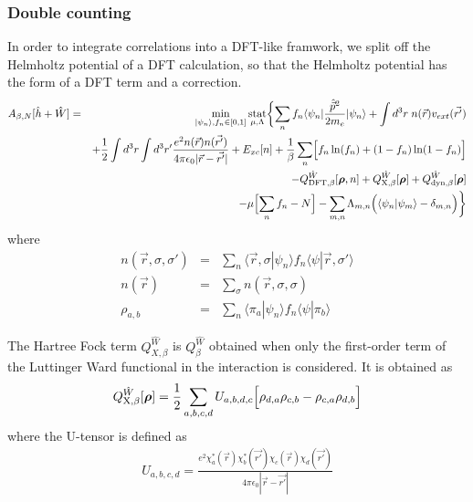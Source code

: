 \documentclass[11pt,a4paper]{report}
\newcommand{\mat}[1]{\bm{#1}}  %
\DeclareMathOperator*{\stat}{stat}
\begin{document}
\subsubsection{Double counting}
In order to integrate correlations into a DFT-like framwork, we split
off the Helmholtz potential of a DFT calculation, so that the
Helmholtz potential has the form of a DFT term and a correction.
\begin{eqnarray}
A_{\beta,N}[\hat{h}+\hat{W}]
&=&\min_{|\psi_n\rangle,f_n\in[0,1]}\stat_{\mu,\Lambda}
\biggl\lbrace
\sum_n f_n\langle\psi_n|\frac{\hat{\vec{p}}^2}{2m_e}|\psi_n\rangle
+\int d^3r\;n(\vec{r})v_{ext}(\vec{r'})
\nonumber\\
&&+\frac{1}{2}\int d^3r\int d^3r'
\frac{e^2n(\vec{r})n(\vec{r'})}{4\pi\epsilon_0|\vec{r}-\vec{r'}|}
+E_{xc}[n]
+\frac{1}{\beta}\sum_n\Bigl[f_n\ln(f_n)+(1-f_n)\ln(1-f_n)\Bigr]
\nonumber\\
&&-Q_{\text{DFT},\beta}^{\hat{W}}[\mat{\rho},n]
  +Q_{\text{X},\beta}^{\hat{W}}[\mat{\rho}]
  +Q_{\text{dyn},\beta}^{\hat{W}}[\mat{\rho}]
\nonumber\\
&&
-\mu\Bigl[\sum_n f_n-N\Bigr]
-\sum_{m,n}\Lambda_{m,n}\Bigl(\langle\psi_n|\psi_m\rangle-\delta_{m,n}\Bigr)
\biggr\rbrace
\label{eq:hp}
\end{eqnarray}
where 
\begin{eqnarray}
n(\vec{r},\sigma,\sigma')&=&
\sum_n\langle\vec{r},\sigma|\psi_n\rangle 
f_n\langle\psi|\vec{r},\sigma'\rangle 
\nonumber\\
n(\vec{r})&=&\sum_\sigma n(\vec{r},\sigma,\sigma)
\nonumber\\
\rho_{a,b}&=&\sum_n\langle\pi_a|\psi_n\rangle 
f_n\langle\psi|\pi_b\rangle 
\end{eqnarray}

The Hartree Fock term $Q^{\hat{W}}_{X,\beta}$ is $Q^{\hat{W}}_\beta$
  obtained when only the first-order term of the Luttinger Ward
  functional in the interaction is considered.
It is obtained as
\begin{eqnarray}
Q_{\text{X},\beta}^{\hat{W}}[\mat{\rho}]
=\frac{1}{2}\sum_{a,b,c,d}U_{a,b,d,c}
\Bigl[\rho_{d,a}\rho_{c,b}-\rho_{c,a}\rho_{d,b}\Bigr]
\end{eqnarray}
where the U-tensor is defined as
\begin{eqnarray}
U_{a,b,c,d}=\frac{e^2\chi^*_a(\vec{r})\chi^*_b(\vec{r'})
\chi_c(\vec{r})\chi_d(\vec{r'})}{4\pi\epsilon_0|\vec{r}-\vec{r'}|}
\end{eqnarray}
\end{document}
